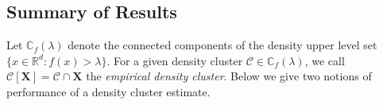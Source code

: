 \documentclass{article}
\newcommand{\Reals}{\mathbb{R}}
\newcommand{\Rd}{\Reals^d}
\newcommand{\1}{\mathbf{1}}
\newcommand{\Xbf}{\mathbf{X}}
\newcommand{\Cbb}{\mathbb{C}}
\newcommand{\Cset}{\mathcal{C}}
\theoremstyle{aldenthm}
\theoremstyle{aldenrmrk}
\begin{document}
\subsection{Summary of Results}





Let $\Cbb_f(\lambda)$ denote the connected components of the density upper level
set $\{x \in \Rd: f(x) > \lambda\}$.  For a given density cluster $\Cset \in
\Cbb_f(\lambda)$, we call $\Cset[\Xbf] = \Cset \cap \Xbf$ the \emph{empirical
density cluster}. Below we give two notions of performance of a density cluster estimate. 
\end{document}
